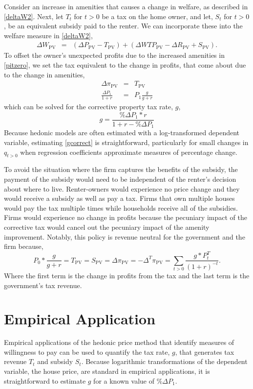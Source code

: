 \documentclass[ecta,nameyear,draft]{econsocart}
\theoremstyle{plain}
\theoremstyle{remark}
\begin{document}
Consider an increase in amenities that causes a change in welfare, as described in \ref{deltaW2}. Next, let $T_t$ for $t>0$ be a tax on the home owner, and let, $S_t$ for $t>0$, be an equivalent subsidy paid to the renter. We can incorporate these into the welfare measure in \ref{deltaW2},
\begin{eqnarray*}
	\Delta W_{\mathrm{PV}}&=& \left(\Delta P_{\mathrm{PV}}-T_{\mathrm{PV}}\right)+\left(\Delta\mathit{WTP}_\mathrm{PV}-\Delta R_{\mathrm{PV}}+S_{\mathrm{PV}}\right).\nonumber
\end{eqnarray*}
To offset the owner's unexpected profits due to the increased amenities in \ref{pitzero}, we set the tax equivalent to the change in profits, that come about due to the change in amenities,
\begin{eqnarray*}
 \Delta \pi_{\mathrm{PV}}&=&T_{\mathrm{PV}}\\
\frac{\Delta P_1}{1+r}&=&P_1\frac{g}{g+r}
\end{eqnarray*}
which can be solved for the corrective property tax rate, $g$,
\begin{equation}
	g=\frac{\% \Delta P_1*r}{1+r-\% \Delta P_1} \label{gcorrect}
\end{equation}
Because hedonic models are often estimated with a log-transformed dependent variable, estimating \ref{gcorrect} is straightforward, particularly for small changes in $q_{t>0}$ when regression coefficients approximate measures of percentage change. 

To avoid the situation where the firm captures the benefits of the subsidy, the payment of the subsidy would need to be independent of the renter's decision about where to live. Renter-owners would experience no price change and they would receive a subsidy as well as pay a tax. Firms that own multiple houses would pay the tax multiple times while households receive all of the subsidies. Firms would experience no change in profits because the pecuniary impact of the corrective tax would cancel out the pecuniary impact of the amenity improvement.
Notably, this policy is revenue neutral for the government and the firm because, 
\begin{equation*}
	P_0*\frac{g}{g+r}=T_{\mathrm{PV}}=S_{\mathrm{PV}}=\Delta \pi_{\mathrm{PV}}=-\Delta^T \pi_{\mathrm{PV}}=\sum_{t>0}\frac{g*P_t^T}{(1+r)^{-t}}.
\end{equation*}
Where the first term is the change in profits from the tax and the last term is the government's tax revenue. 

 
\section{Empirical Application}
Empirical applications of the hedonic price method that identify measures of willingness to pay can be used to quantify the tax rate, $g$, that generates tax revenue $T_t$ and subsidy $S_t$. Because logarithmic transformations of the dependent variable, the house price, are standard in empirical applications, it is straightforward to estimate $g$ for a known value of $\%\Delta P_1 $. 
\end{document}
